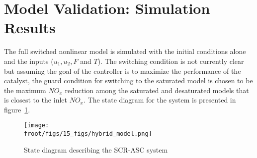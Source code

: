 \newpage
\section{Model Validation: Simulation Results}

The full switched nonlinear model is simulated with the initial conditions alone and the inputs ($u_1, u_2, F$ and $T$). The switching condition is not currently clear but assuming the goal of the controller is to maximize the performance of the catalyst, the guard condition for switching to the saturated model is chosen to be the maximum $NO_x$ reduction among the saturated and desaturated models that is closest to the inlet $NO_x$. The state diagram for the system is presented in figure~\ref{fig::hybrid_automata}.

\begin{figure}[H]
        \centering
        \texttt{[image: \\froot/figs/15\_figs/hybrid\_model.png]}
        \caption{State diagram describing the SCR-ASC system}
        \label{fig::hybrid_automata}
\end{figure}

